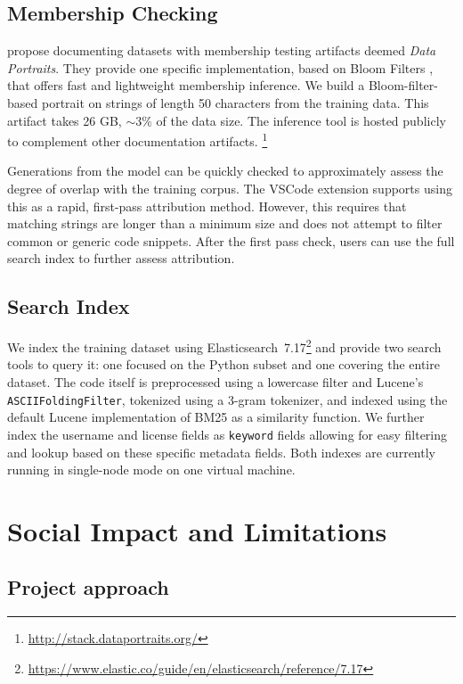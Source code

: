 \documentclass[10pt]{article} %
\begin{document}
\subsection{Membership Checking}
\citet{marone-data-portraits-search} propose documenting datasets with membership testing artifacts deemed \emph{Data Portraits}.
They provide one specific implementation, based on Bloom Filters \citep{bloom-filters-10.1145/362686.362692}, that offers fast and lightweight membership inference.
We build a Bloom-filter-based portrait on strings of length 50 characters from the training data.
This artifact takes 26 GB, $\sim3\%$ of the data size.
The inference tool is hosted publicly to complement other documentation artifacts. \footnote{\url{http://stack.dataportraits.org/}}

Generations from the model can be quickly checked to approximately assess the degree of overlap with the training corpus.
The VSCode extension supports using this as a rapid, first-pass attribution method.
However, this requires that matching strings are longer than a minimum size and does not attempt to filter common or generic code snippets.
After the first pass check, users can use the full search index to further assess attribution. 

\subsection{Search Index}
We index the training dataset using Elasticsearch~7.17\footnote{\url{https://www.elastic.co/guide/en/elasticsearch/reference/7.17}} and provide two search tools to query it: one focused on the Python subset and one covering the entire dataset.
The code itself is preprocessed using a lowercase filter and Lucene's \texttt{ASCIIFoldingFilter}, tokenized using a 3-gram tokenizer, and indexed using the default Lucene implementation of BM25 as a similarity function. We further index the username and license fields as \texttt{keyword} fields allowing for easy filtering and lookup based on these specific metadata fields. Both indexes are currently running in single-node mode on one virtual machine.

\section{Social Impact and Limitations}

\subsection{Project approach}
\end{document}
